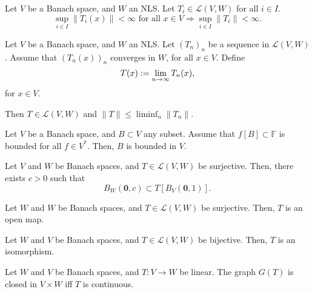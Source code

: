 \documentclass[12pt]{article}	%
\begin{document}
\begin{cor}
	Let $V$ be a Banach space, and $W$ an NLS. Let $T_{i} \in \mathcal{L}(V, W)$ for all $i \in I$. 
	\begin{equation*} 
		\sup_{i \in I} \|T_{i}(x)\| < \infty \text{ for all $x \in V$} \Rightarrow \sup_{i \in I} \|T_{i}\| < \infty.
	\end{equation*}
\end{cor}

\begin{cor}
	Let $V$ be a Banach space, and $W$ an NLS. Let $(T_{n})_{n}$ be a sequence in $\mathcal{L}(V, W)$. Assume that $(T_{n}(x))_{n}$ converges in $W$, for all $x \in V$. Define
	\begin{equation*} 
		T(x) \vcentcolon= \lim_{n \to \infty} T_{n}(x),
	\end{equation*}
	for $x \in V$.

	Then $T \in \mathcal{L}(V, W)$ and $\|T\| \le \liminf_{n} \|T_{n}\|$.
\end{cor}

\begin{cor}
	Let $V$ be a Banach space, and $B \subset V$ any subset. Assume that $f[B] \subset \mathbb{F}$ is bounded for all $f \in V^{\ast}$. Then, $B$ is bounded in $V$.
\end{cor}

\begin{prop}
	Let $V$ and $W$ be Banach spaces, and $T \in \mathcal{L}(V, W)$ be surjective. Then, there exists $c > 0$ such that
	\begin{equation*} 
		B_{W}(\mathbf{0}, c) \subset T[B_{V}(\mathbf{0}, 1)].
	\end{equation*}
\end{prop}

\begin{thm}
	Let $W$ and $W$ be Banach spaces, and $T \in \mathcal{L}(V, W)$ be surjective. Then, $T$ is an open map.
\end{thm}

\begin{cor}
	Let $W$ and $V$ be Banach spaces, and $T \in \mathcal{L}(V, W)$ be bijective. Then, $T$ is an isomorphism.
\end{cor}

\begin{thm}
	Let $W$ and $V$ be Banach spaces, and $T : V \to W$ be linear. \newline
	The graph $G(T)$ is closed in $V \times W$ iff $T$ is continuous.
\end{thm}
\end{document}
